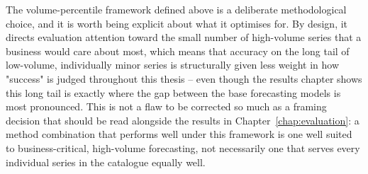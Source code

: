 The volume-percentile framework defined above is a deliberate methodological choice, and it is worth being explicit about what it optimises for. By design, it directs evaluation attention toward the small number of high-volume series that a business would care about most, which means that accuracy on the long tail of low-volume, individually minor series is structurally given less weight in how "success" is judged throughout this thesis -- even though the results chapter shows this long tail is exactly where the gap between the base forecasting models is most pronounced. This is not a flaw to be corrected so much as a framing decision that should be read alongside the results in Chapter~\ref{chap:evaluation}: a method combination that performs well under this framework is one well suited to business-critical, high-volume forecasting, not necessarily one that serves every individual series in the catalogue equally well.